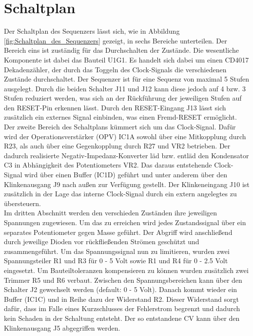 \newpage
\section{Schaltplan}
Der Schaltplan des Sequenzers lässt sich, wie in Abbildung \ref{fig:Schaltplan_des_Sequenzers} gezeigt, in sechs Bereiche unterteilen. Der Bereich eins ist zuständig für das Durchschalten der Zustände.
Die wesentliche Komponente ist dabei das Bauteil U1G1. Es handelt sich dabei um einen CD4017 Dekadenzähler, der durch das Toggeln des Clock-Signals die verschiedenen Zustände durchschaltet. Der Sequenzer ist für eine Sequenz von maximal 5 Stufen ausgelegt. Durch die beiden Schalter J11 und J12 kann diese jedoch auf 4 bzw. 3 Stufen reduziert werden, was sich an der Rückführung der jeweiligen Stufen auf den RESET-Pin erkennen lässt. Durch den RESET-Eingang J13 lässt sich zusätzlich ein externes Signal einbinden, was einen Fremd-RESET ermöglicht.\\
Der zweite Bereich des Schaltplans kümmert sich um das Clock-Signal. Dafür wird der Operationsverstärker (OPV) IC1A sowohl über eine Mitkopplung durch R23, als auch über eine Gegenkopplung durch R27 und VR2 betrieben. Der dadurch realisierte Negativ-Impedanz-Konverter läd bzw. entläd den Kondensator C3 in Abhängigkeit des Potentiometers VR2. Das daraus entstehende Clock-Signal wird über einen Buffer (IC1D) geführt und unter anderem über den Klinkenausgang J9 nach außen zur Verfügung gestellt. Der Klinkeneingang J10 ist zusätzlich in der Lage das interne Clock-Signal durch ein extern angelegtes zu übersteuern.\\
Im dritten Abschnitt werden den verschieden Zuständen ihre jeweiligen Spannungen zugewiesen. Um das zu erreichen wird jedes Zustandssignal über ein separates Potentiometer gegen Masse geführt. Der Abgriff wird anschließend durch jeweilige Dioden vor rückfließenden Strömen geschützt und zusammengeführt. Um das Spannungssignal nun zu limitieren, wurden zwei Spannungsteiler R1 und R3 für 0 - 5 Volt sowie R1 und R4 für 0 - 2.5 Volt eingesetzt. Um Bauteiltoleranzen kompensieren zu können wurden zusätzlich zwei Trimmer R5 und R6 verbaut. Zwischen den Spannungsbereichen kann über den Schalter J2 gewechselt werden (default: 0 - 5 Volt). Danach kommt wieder ein Buffer (IC1C) und in Reihe dazu der Widerstand R2. Dieser Widerstand sorgt dafür, dass im Falle eines Kurzschlusses der Fehlerstrom begrenzt und dadurch kein Schaden in der Schaltung entsteht. Der so entstandene CV kann über den Klinkenausgang J5 abgegriffen werden.\\
